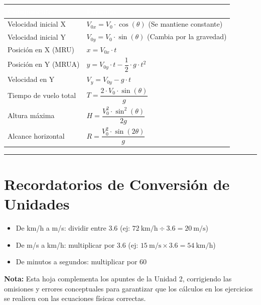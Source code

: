 \documentclass[10pt,a4paper]{article}
\newcommand{\infobox}[1]{%
  \begin{tcolorbox}[colback=grisclr, colframe=gris, arc=4pt, boxrule=0.3pt,
    left=8pt, right=8pt, top=4pt, bottom=4pt, width=\textwidth]
    \small\textcolor{gris}{#1}
  \end{tcolorbox}%
}
\begin{document}
\vspace{4pt}
\begin{tabularx}{\textwidth}{LL}
  \toprule
  \textbf{\textcolor{white}{Componente}} &
  \textbf{\textcolor{white}{Fórmula}} \\
  \midrule
  Velocidad inicial X & $V_{0x} = V_0 \cdot \cos(\theta)$ \hfill (Se mantiene constante) \\
  Velocidad inicial Y & $V_{0y} = V_0 \cdot \sin(\theta)$ \hfill (Cambia por la gravedad) \\
  Posición en X (MRU) & $x = V_{0x} \cdot t$ \\
  Posición en Y (MRUA) & $y = V_{0y} \cdot t - \dfrac{1}{2} \cdot g \cdot t^2$ \\
  Velocidad en Y & $V_y = V_{0y} - g \cdot t$ \\
  Tiempo de vuelo total & $T = \dfrac{2 \cdot V_0 \cdot \sin(\theta)}{g}$ \\
  Altura máxima & $H = \dfrac{V_0^2 \cdot \sin^2(\theta)}{2g}$ \\
  Alcance horizontal & $R = \dfrac{V_0^2 \cdot \sin(2\theta)}{g}$ \\
  \bottomrule
\end{tabularx}
\vspace{12pt}

\vspace{6pt}
\hrule height 0.5pt
\vspace{12pt}

\section*{Recordatorios de Conversión de Unidades}
\begin{itemize}[leftmargin=*, nosep]
  \item De km/h a m/s: dividir entre 3.6 \hfill (ej: $72\ \text{km/h} \div 3.6 = 20\ \text{m/s}$)
  \item De m/s a km/h: multiplicar por 3.6 \hfill (ej: $15\ \text{m/s} \times 3.6 = 54\ \text{km/h}$)
  \item De minutos a segundos: multiplicar por 60
\end{itemize}

\vspace{8pt}
\infobox{\textbf{Nota:} Esta hoja complementa los apuntes de la Unidad 2, corrigiendo las omisiones y errores conceptuales para garantizar que los cálculos en los ejercicios se realicen con las ecuaciones físicas correctas.}
\end{document}
